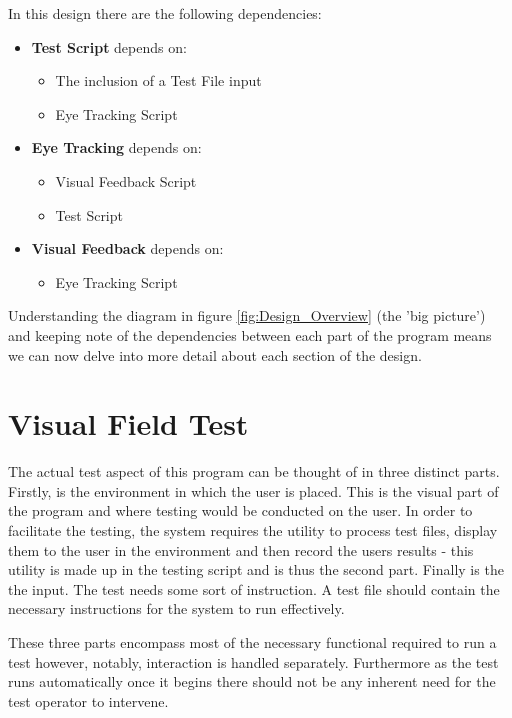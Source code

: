 \documentclass{l4proj}
\begin{document}
In this design there are the following dependencies:
\begin{itemize}
    \item \textbf{Test Script} depends on:
    \begin{itemize}
        \item The inclusion of a Test File input
        \item Eye Tracking Script
    \end{itemize}
    \item \textbf{Eye Tracking} depends on:
    \begin{itemize}
        \item Visual Feedback Script
        \item Test Script
    \end{itemize}
    \item \textbf{Visual Feedback} depends on:
    \begin{itemize}
        \item Eye Tracking Script
    \end{itemize}
\end{itemize}

Understanding the diagram in figure \ref{fig:Design_Overview} (the 'big picture') and keeping note of the dependencies between each part of the program means we can now delve into more detail about each section of the design.

\section{Visual Field Test} \label{design-vft}
The actual test aspect of this program can be thought of in three distinct parts. Firstly, is the environment in which the user is placed. This is the visual part of the program and where testing would be conducted on the user. In order to facilitate the testing, the system requires the utility to process test files, display them to the user in the environment and then record the users results - this utility is made up in the testing script and is thus the second part. Finally is the the input. The test needs some sort of instruction. A test file should contain the necessary instructions for the system to run effectively. 

These three parts encompass most of the necessary functional required to run a test however, notably, interaction is handled separately. Furthermore as the test runs automatically once it begins there should not be any inherent need for the test operator to intervene. 
\end{document}
